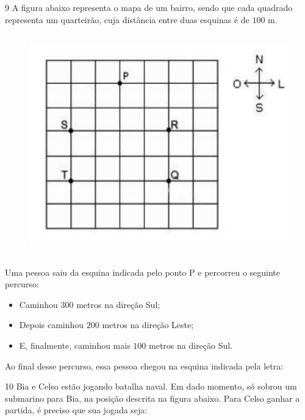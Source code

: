 
\num{9}  A figura abaixo representa o mapa de um bairro, sendo que cada
quadrado representa um quarteirão, cuja distância entre duas esquinas é
de $100$ m.

\begin{figure}[h]
\centering\includegraphics[width=4.82569in,height=3.77917in]{./imgSAEB_6_MAT/media/image72.png}
\end{figure}

Uma pessoa saiu da esquina indicada pelo ponto P e percorreu o seguinte
percurso:

\begin{itemize}
\item Caminhou $300$ metros na direção Sul;
\item Depois caminhou $200$ metros na direção Leste;
\item E, finalmente, caminhou mais $100$ metros na direção Sul.
\end{itemize}

Ao final desse percurso, essa pessoa chegou na esquina indicada pela
letra: 

\num{10} Bia e Celso estão jogando batalha naval. Em dado momento, só sobrou
um submarino para Bia, na posição descrita na figura abaixo. Para Celso ganhar a partida, é preciso que sua jogada seja:


